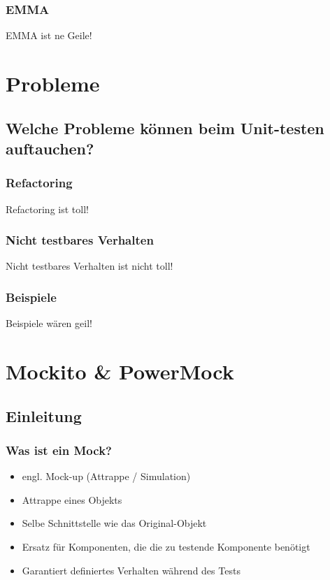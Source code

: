 \documentclass{beamer}
\begin{document}
			\begin{frame}
				\frametitle{EMMA}
				EMMA ist ne Geile!
			\end{frame}

	
	\section{Probleme}

		\subsection{Welche Probleme können beim Unit-testen auftauchen?}
		
			\begin{frame}
				\frametitle{Refactoring}
				Refactoring ist toll!
			\end{frame}

			\begin{frame}
				\frametitle{Nicht testbares Verhalten}
				Nicht testbares Verhalten ist nicht toll!
			\end{frame}

			\begin{frame}
				\frametitle{Beispiele}
				Beispiele wären geil!
			\end{frame}

	
	\section{Mockito \& PowerMock}
		\subsection{Einleitung}
			\begin{frame}
				\frametitle{Was ist ein Mock?}
				\begin{itemize}
					\item{engl. Mock-up (Attrappe / Simulation)}
					\item{Attrappe eines Objekts}
					\item{Selbe Schnittstelle wie das Original-Objekt}
					\item{Ersatz für Komponenten, die die zu testende Komponente benötigt}
					\item{Garantiert definiertes Verhalten während des Tests}
				\end{itemize}

			\end{frame}
\end{document}
